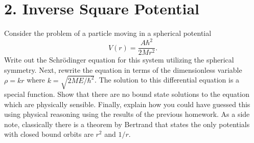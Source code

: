 \documentclass[a4paper,twoside]{article}
\begin{document}
\section*{2. Inverse Square Potential}
Consider the problem of a particle moving in a spherical potential
\begin{equation}
    V(r) = \frac{A \hbar^2}{2M r^2}.
\end{equation}
Write out the Schr\"odinger equation for this system utilizing the spherical symmetry. Next, rewrite the equation in terms of the dimensionless variable $ \rho = kr $ where $ k = \sqrt{2ME/ \hbar^2} $. The solution to this differential equation is a special function. Show that there are no bound state solutions to the equation which are physically sensible. Finally, explain how you could have guessed this using physical reasoning using the results of the previous homework. As a side note, classically there is a theorem by Bertrand that states the only potentials with closed bound orbits are $ r^2 $ and $ 1/r $.
\end{document}

